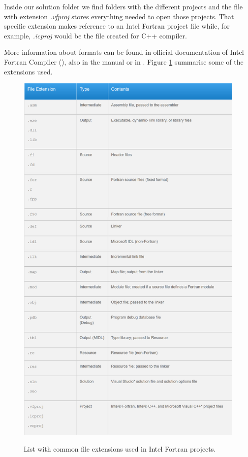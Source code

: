 \begin{itemize}
    Inside our solution folder we find folders with the different projects and the file with extension \textit{.vfproj} stores everything needed to open those projects. That specific extension makes reference to an Intel Fortran project file while, for example, \textit{.icproj} would be the file created for C++ compiler.
    
    More information about formats can be found in official documentation of Intel Fortran Compiler (\citep{format}), also in the manual \citep{manual} or in \citep{format2}. Figure \ref{fig:Formats} summarise some of the extensions used.
    
    \begin{figure}[h]
        \centering
        \caption{List with common file extensions used in Intel Fortran projects.}
        \includegraphics[width= 0.85 \textwidth]{Figures/Formats}
        \label{fig:Formats}
    \end{figure}
    
     
    
\end{itemize}